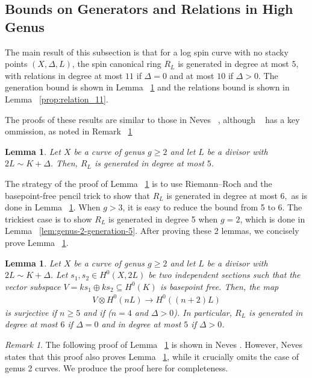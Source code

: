 \documentclass{amsart}
\theoremstyle{plain}
\newtheorem{lem}[thm]{Lemma}
\theoremstyle{definition}
\theoremstyle{remark}
\newtheorem{rem}[thm]{Remark}
\numberwithin{equation}{section}
\newcommand\ssec{\subsection}
\begin{document}
\ssec{Bounds on Generators and Relations in High Genus}

The main result of this subsection is that for a log spin curve with no stacky points $(X,\Delta,L)$, the spin canonical ring $R_L$ is generated in degree at most $5$, with relations in degree at most $11$ if $\Delta = 0$ and at most $10$ if $\Delta > 0$. The generation bound is shown in Lemma ~\ref{lem:generation_5} and the relations bound is shown in Lemma ~\ref{prop:relation_11}. 

The proofs of these results are similar to those in Neves ~\cite[Proposition III.4 and Proposition III.12]{neves:halfcan}, although ~\cite[Proposition III.4]{neves:halfcan} has a key ommission, as noted in Remark ~\ref{rem:neves-omission}

\begin{lem}
\label{lem:generation_5}
Let $X$ be a curve of genus $g \geq 2$ and let $L$ be a divisor with $2 L \sim K +\Delta$. Then, $R_L$ is generated in degree at most $5$.
\end{lem}

The strategy of the proof of Lemma ~\ref{lem:generation_5} is to use Riemann--Roch and the basepoint-free pencil trick to show that $R_L$ is generated in degree at most $6,$ as is done in Lemma ~\ref{lem:semicanonical_generation}. When $g > 3$, it is easy to reduce the bound from 5 to 6. The trickiest case is to show $R_L$ is generated in degree 5 when $g = 2$, which is done in Lemma ~\ref{lem:genus-2-generation-5}. After proving these 2 lemmas, we concisely prove Lemma ~\ref{lem:generation_5}.

\begin{lem}
\label{lem:semicanonical_generation}
Let $X$ be a curve of genus $g \geq 2$ and let $L$ be a divisor with $2 L \sim K + \Delta$. Let $s_1,s_2 \in H^0(X,2L)$ be two independent sections such that the vector subspace $V = ks_1 \oplus k s_2 \subseteq H^0(K)$ is basepoint free. Then, the map
\begin{align*}
	V \otimes H^0(nL) \rightarrow H^0((n+2)L)
\end{align*}
is surjective if $n \geq 5$ and if {\rm(}$n = 4$ and $\Delta > 0${\rm)}.
In particular, $R_L$ is generated in degree at most $6$ if $\Delta = 0$ and in degree at most $5$ if $\Delta > 0$.
\end{lem}

\begin{rem}
\label{rem:neves-omission}
The following proof of Lemma ~\ref{lem:semicanonical_generation} is shown in Neves \cite[Proposition III.4]{neves:halfcan}. However, Neves states that this proof also proves Lemma ~\ref{lem:generation_5}, while it crucially omits the case of genus 2 curves. We produce the proof here for completeness.
\end{rem}
\end{document}

